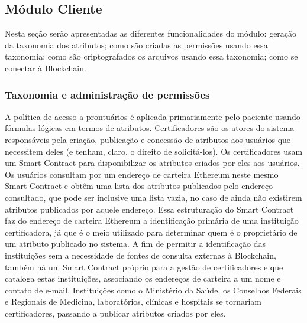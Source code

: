 \documentclass[a4paper,11pt]{article}
\begin{document}
\subsection{Módulo Cliente}

Nesta seção serão apresentadas as diferentes funcionalidades do módulo: geração da taxonomia dos atributos; como são criadas as permissões usando essa taxonomia; como são criptografados os arquivos usando essa taxonomia; como se conectar à Blockchain.

\subsubsection{Taxonomia e administração de permissões}
\label{sec:sub:taxonomia-permissoes}

A política de acesso a prontuários é aplicada primariamente pelo paciente usando fórmulas lógicas em termos de atributos.
Certificadores são os atores do sistema responsáveis pela criação, publicação e concessão de atributos aos usuários que necessitem deles (e tenham, claro, o direito de solicitá-los).
Os certificadores usam um Smart Contract para disponibilizar os atributos criados por eles aos usuários.
Os usuários consultam por um endereço de carteira Ethereum neste mesmo Smart Contract e obtêm uma lista dos atributos publicados pelo endereço consultado, que pode ser inclusive uma lista vazia, no caso de ainda não existirem atributos publicados por aquele endereço.
Essa estruturação do Smart Contract faz do endereço de carteira Ethereum a identificação primária de uma instituição certificadora, já que é o meio utilizado para determinar quem é o proprietário de um atributo publicado no sistema.
A fim de permitir a identificação das instituições sem a necessidade de fontes de consulta externas à Blockchain, também há um Smart Contract próprio para a gestão de certificadores e que cataloga estas instituições, associando os endereços de carteira a um nome e contato de e-mail. %
Instituições como o Ministério da Saúde, os Conselhos Federais e Regionais de Medicina, laboratórios, clínicas e hospitais se tornariam certificadores, passando a publicar atributos criados por eles.
\end{document}
